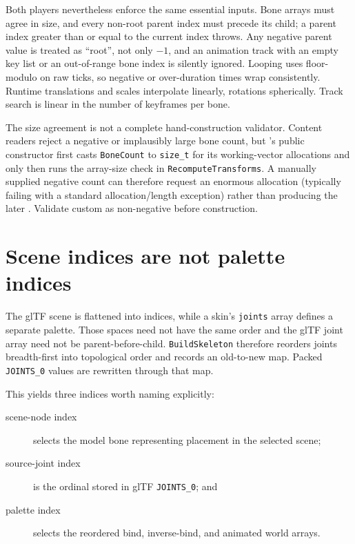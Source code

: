 Both players nevertheless enforce the same essential inputs. Bone arrays must agree in size,
and every non-root parent index must precede its child; a parent index greater than or equal to
the current index throws. Any negative parent value is treated as ``root'', not only $-1$, and an
animation track with an empty key list or an out-of-range bone index is silently ignored. Looping
uses floor-modulo on raw ticks, so negative or over-duration times wrap consistently. Runtime
translations and scales interpolate linearly, rotations spherically. Track search is linear in
the number of keyframes per bone.

The size agreement is not a complete hand-construction validator. Content readers reject a
negative or implausibly large bone count, but 's public constructor first
casts \texttt{BoneCount} to \texttt{size\_t} for its working-vector allocations and only then runs
the array-size check in \texttt{RecomputeTransforms}. A manually supplied negative count can
therefore request an enormous allocation (typically failing with a standard allocation/length
exception) rather than producing the later . Validate custom
 as non-negative before construction.

\section{Scene indices are not palette indices}

The glTF scene is flattened into  indices, while a skin's
\texttt{joints} array defines a separate palette. Those spaces need not have the same order and
the glTF joint array need not be parent-before-child. \texttt{BuildSkeleton} therefore
reorders joints breadth-first into topological order and records an old-to-new map. Packed
\texttt{JOINTS\_0} values are rewritten through that map.

This yields three indices worth naming explicitly:

\begin{description}
  \item[scene-node index] selects the model bone representing placement in the selected scene;
  \item[source-joint index] is the ordinal stored in glTF \texttt{JOINTS\_0}; and
  \item[palette index] selects the reordered bind, inverse-bind, and animated world arrays.
\end{description}

